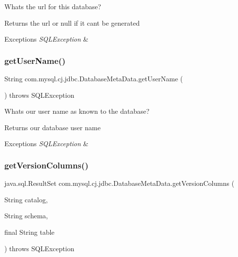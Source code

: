 What\textquotesingle{}s the url for this database?

\begin{DoxyReturn}{Returns}
the url or null if it can\textquotesingle{}t be generated 
\end{DoxyReturn}

\begin{DoxyExceptions}{Exceptions}
{\em S\+Q\+L\+Exception} & \\
\hline
\end{DoxyExceptions}
\mbox{\label{classcom_1_1mysql_1_1cj_1_1jdbc_1_1_database_meta_data_a9fe2eb13aa496f7a607a6c88d9f9fc8d}} 
\subsubsection{\texorpdfstring{get\+User\+Name()}{getUserName()}}
{\footnotesize\ttfamily String com.\+mysql.\+cj.\+jdbc.\+Database\+Meta\+Data.\+get\+User\+Name (\begin{DoxyParamCaption}{ }\end{DoxyParamCaption}) throws S\+Q\+L\+Exception}

What\textquotesingle{}s our user name as known to the database?

\begin{DoxyReturn}{Returns}
our database user name 
\end{DoxyReturn}

\begin{DoxyExceptions}{Exceptions}
{\em S\+Q\+L\+Exception} & \\
\hline
\end{DoxyExceptions}
\mbox{\label{classcom_1_1mysql_1_1cj_1_1jdbc_1_1_database_meta_data_acf5d600c5e4bd59cb60e90d355d439c4}} 
\subsubsection{\texorpdfstring{get\+Version\+Columns()}{getVersionColumns()}}
{\footnotesize\ttfamily java.\+sql.\+Result\+Set com.\+mysql.\+cj.\+jdbc.\+Database\+Meta\+Data.\+get\+Version\+Columns (\begin{DoxyParamCaption}\item[{String}]{catalog,  }\item[{String}]{schema,  }\item[{final String}]{table }\end{DoxyParamCaption}) throws S\+Q\+L\+Exception}

